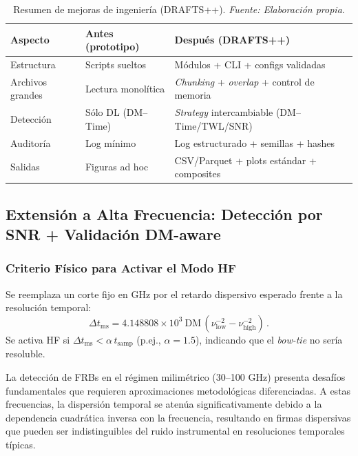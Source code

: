 \begin{table}[h] 
\centering 
  \caption{\label{tab:mejoras} Resumen de mejoras de ingeniería (DRAFTS++). \textit{Fuente: Elaboración propia}.}
\begin{tabular}{p{} p{} p{}} 
\toprule 
    \textbf{Aspecto} & \textbf{Antes (prototipo)} & \textbf{Después (DRAFTS++)} \\
\midrule 
Estructura & Scripts sueltos & Módulos + CLI + configs validadas \\ 
    Archivos grandes & Lectura monolítica & \emph{Chunking} + \emph{overlap} + control de memoria \\
    Detección & Sólo DL (DM--Time) & \emph{Strategy} intercambiable (DM--Time/TWL/SNR) \\
Auditoría & Log mínimo & Log estructurado + semillas + hashes \\ 
    Salidas & Figuras ad hoc & CSV/Parquet + plots estándar + composites \\
\bottomrule 
\end{tabular} 
\end{table}

\subsection{Extensión a Alta Frecuencia: Detección por SNR + Validación DM-aware}

\subsubsection{Criterio Físico para Activar el Modo HF}

Se reemplaza un corte fijo en GHz por el retardo dispersivo esperado frente a la resolución temporal:
\[
\Delta t_{\mathrm{ms}} = 4.148808 \times 10^{3}\ \mathrm{DM}\,(\nu_{\mathrm{low}}^{-2}-\nu_{\mathrm{high}}^{-2}) \, .
\]
Se activa HF si $\Delta t_{\mathrm{ms}} < \alpha\, t_{\mathrm{samp}}$ (p.ej., $\alpha\!=\!1.5$), indicando que el \textit{bow-tie} no sería resoluble.

La detección de FRBs en el régimen milimétrico (30--100 GHz) presenta desafíos fundamentales que requieren aproximaciones metodológicas diferenciadas. A estas frecuencias, la dispersión temporal se atenúa significativamente debido a la dependencia cuadrática inversa con la frecuencia, resultando en firmas dispersivas que pueden ser indistinguibles del ruido instrumental en resoluciones temporales típicas.

